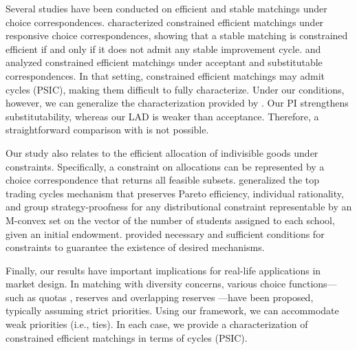 Several studies have been conducted on efficient and stable matchings under choice correspondences.
\citet{erdil2008s} characterized constrained efficient matchings under responsive choice correspondences, showing that a stable matching is constrained efficient if and only if it does not admit any stable improvement cycle.
\citet{erdil2019efficiency} and \citet{erdil2022corrigendum} analyzed constrained efficient matchings under acceptant and substitutable correspondences. In that setting, constrained efficient matchings may admit cycles (PSIC), making them difficult to fully characterize.
Under our conditions, however, we can generalize the characterization provided by \citet{erdil2008s}.
Our PI strengthens substitutability, whereas our LAD is weaker than acceptance. Therefore, a straightforward comparison with \citet{erdil2019efficiency} is not possible.

Our study also relates to the efficient allocation of indivisible goods under constraints. Specifically, a constraint on allocations can be represented by a choice correspondence that returns all feasible subsets.
\citet{suzuki2018efficient,STYYZ2023} generalized the top trading cycles mechanism that preserves Pareto efficiency, individual rationality, and group strategy-proofness for any distributional constraint representable by an M-convex set on the vector of the number of students assigned to each school, given an initial endowment.
\citet{IK2024,IK2024b} provided necessary and sufficient conditions for constraints to guarantee the existence of desired mechanisms.

Finally, our results have important implications for real-life applications in market design. In matching with diversity concerns, various choice functions---such as quotas \citep{abdulkadirouglu2003school}, reserves \citep{hafalir2013effective,ehlers2014school} and overlapping reserves \citep{sonmez2022affirmative}---have been proposed, typically assuming strict priorities. Using our framework, we can accommodate weak priorities (i.e., ties). In each case, we provide a characterization of constrained efficient matchings in terms of cycles (PSIC).